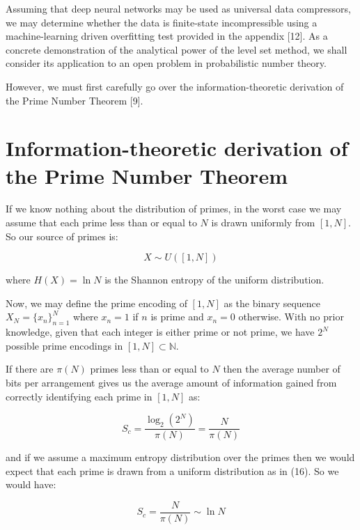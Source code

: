 \documentclass{article}
\begin{document}
Assuming that deep neural networks may be used as universal data compressors, we may determine whether the data is finite-state incompressible using a machine-learning driven overfitting test provided in the appendix [12]. As a concrete demonstration of the analytical power of the level set method, we shall consider its application to an open problem in probabilistic number theory. 

However, we must first carefully go over the information-theoretic derivation of the Prime Number Theorem [9]. 

\newpage 

\section{Information-theoretic derivation of the Prime Number Theorem}

If we know nothing about the distribution of primes, in the worst case we 
may assume that each prime less than or equal to $N$ is drawn uniformly from $[1,N]$. So our source of primes is: 

\begin{equation}
X \sim U([1,N])	
\end{equation}

where $H(X) = \ln N$ is the Shannon entropy of the uniform distribution. 

Now, we may define the prime encoding of $[1,N]$ as the binary sequence $X_N = \{x_n\}_{n=1}^N$ where $x_n = 1$ if $n$ is prime and $x_n = 0$ otherwise. With no prior knowledge, given that each integer is either prime or not prime, we have $2^N$ possible prime encodings in $[1,N] \subset \mathbb{N}$. 

If there are $\pi(N)$ primes less than or equal to $N$ then the average number of bits per arrangement gives us the average amount of information gained from correctly identifying each prime in $[1,N]$ as: 

\begin{equation}
S_c = \frac{\log_2 (2^N)}{\pi(N)} = \frac{N}{\pi(N)}	
\end{equation}

and if we assume a maximum entropy distribution over the primes then we would expect that each prime is drawn from a uniform distribution as in (16). So we would have: 

\begin{equation}
S_c = \frac{N}{\pi(N)} \sim \ln N	
\end{equation}
\end{document}
